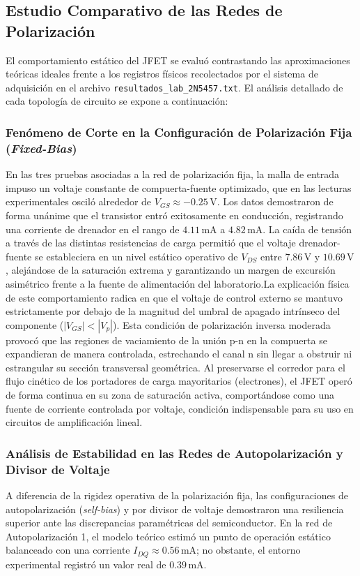 \documentclass[conference]{IEEEtran}
\begin{document}
\subsection{Estudio Comparativo de las Redes de Polarización}
El comportamiento estático del JFET se evaluó contrastando las aproximaciones
teóricas ideales frente a los registros físicos recolectados por el sistema de
adquisición en el archivo \texttt{resultados\_lab\_2N5457.txt}. El análisis
detallado de cada topología de circuito se expone a continuación:

\subsubsection{Fenómeno de Corte en la Configuración de Polarización Fija (\textit{Fixed-Bias})}
En las tres pruebas asociadas a la red de polarización fija, la malla de entrada impuso un voltaje constante de compuerta-fuente optimizado, que en las lecturas experimentales osciló alrededor de $V_{GS} \approx -0.25\,\text{V}$. Los datos demostraron de forma unánime que el transistor entró exitosamente en conducción, registrando una corriente de drenador en el rango de $4.11\,\text{mA}$ a $4.82\,\text{mA}$. La caída de tensión a través de las distintas resistencias de carga permitió que el voltaje drenador-fuente se estableciera en un nivel estático operativo de $V_{DS}$ entre $7.86\,\text{V}$ y $10.69\,\text{V}$, alejándose de la saturación extrema y garantizando un margen de excursión asimétrico frente a la fuente de alimentación del laboratorio.La explicación física de este comportamiento radica en que el voltaje de control externo se mantuvo estrictamente por debajo de la magnitud del umbral de apagado intrínseco del componente ($|V_{GS}| < |V_p|$). Esta condición de polarización inversa moderada provocó que las regiones de vaciamiento de la unión p-n en la compuerta se expandieran de manera controlada, estrechando el canal n sin llegar a obstruir ni estrangular su sección transversal geométrica. Al preservarse el corredor para el flujo cinético de los portadores de carga mayoritarios (electrones), el JFET operó de forma continua en su zona de saturación activa, comportándose como una fuente de corriente controlada por voltaje, condición indispensable para su uso en circuitos de amplificación lineal.

\subsubsection{Análisis de Estabilidad en las Redes de Autopolarización y Divisor de Voltaje}
A diferencia de la rigidez operativa de la polarización fija, las
configuraciones de autopolarización (\textit{self-bias}) y por divisor de
voltaje demostraron una resiliencia superior ante las discrepancias
paramétricas del semiconductor. En la red de Autopolarización 1, el modelo
teórico estimó un punto de operación estático balanceado con una corriente
$I_{DQ} \approx 0.56\,\text{mA}$; no obstante, el entorno experimental registró
un valor real de $0.39\,\text{mA}$.
\end{document}
